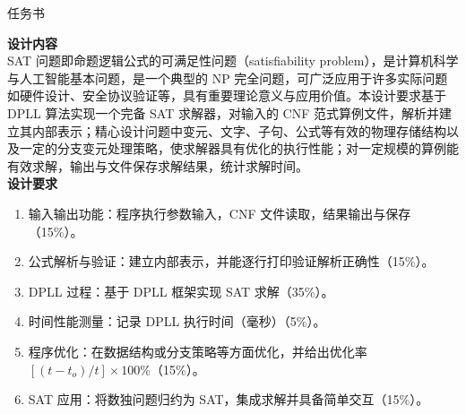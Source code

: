 \documentclass[UTF8]{ctexart}
\newcommand{\heiti}{\CJKfamily{hei}}
\newcommand{\bodyfont}{\songti\zihao{-4}}
\begin{document}
\bodyfont

\begin{center}
  {\heiti{} 任务书}\\[0.5em]
\end{center}

\noindent
\textbf{设计内容}\\
SAT 问题即命题逻辑公式的可满足性问题（satisfiability problem），是计算机科学与人工智能基本问题，是一个典型的 NP 完全问题，可广泛应用于许多实际问题如硬件设计、安全协议验证等，具有重要理论意义与应用价值。本设计要求基于 DPLL 算法实现一个完备 SAT 求解器，对输入的 CNF 范式算例文件，解析并建立其内部表示；精心设计问题中变元、文字、子句、公式等有效的物理存储结构以及一定的分支变元处理策略，使求解器具有优化的执行性能；对一定规模的算例能有效求解，输出与文件保存求解结果，统计求解时间。\\

\noindent
\textbf{设计要求}
\begin{enumerate}
  \item 输入输出功能：程序执行参数输入，CNF 文件读取，结果输出与保存（15\%）。
  \item 公式解析与验证：建立内部表示，并能逐行打印验证解析正确性（15\%）。
  \item DPLL 过程：基于 DPLL 框架实现 SAT 求解（35\%）。
  \item 时间性能测量：记录 DPLL 执行时间（毫秒）（5\%）。
  \item 程序优化：在数据结构或分支策略等方面优化，并给出优化率 $[(t{-}t_o)/t]{\times}100\%$（15\%）。
  \item SAT 应用：将数独问题归约为 SAT，集成求解并具备简单交互（15\%）。
\end{enumerate}
\end{document}
